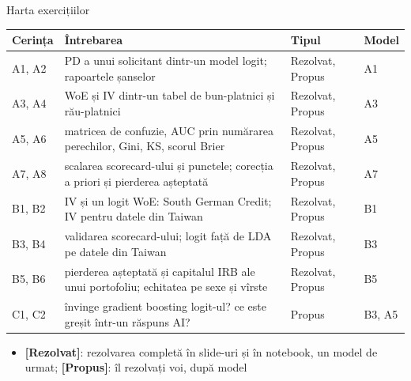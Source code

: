 \begin{frame}{Harta exercițiilor}
\itemsize{\small}
\begin{center}
\footnotesize
\begin{tabular}{>{\raggedright\arraybackslash}p{1.1cm}>{\raggedright\arraybackslash}p{7.5cm}>{\raggedright\arraybackslash}p{1.9cm}>{\raggedright\arraybackslash}p{1.4cm}}
\toprule
\textbf{Cerința} & \textbf{Întrebarea} & \textbf{Tipul} & \textbf{Model} \\
\midrule
A1, A2 & PD a unui solicitant dintr-un model logit; rapoartele șanselor & Rezolvat, Propus & A1 \\
A3, A4 & WoE și IV dintr-un tabel de bun-platnici și rău-platnici & Rezolvat, Propus & A3 \\
A5, A6 & matricea de confuzie, AUC prin numărarea perechilor, Gini, KS, scorul Brier & Rezolvat, Propus & A5 \\
A7, A8 & scalarea scorecard-ului și punctele; corecția a priori și pierderea așteptată & Rezolvat, Propus & A7 \\
B1, B2 & IV și un logit WoE: South German Credit; IV pentru datele din Taiwan & Rezolvat, Propus & B1 \\
B3, B4 & validarea scorecard-ului; logit față de LDA pe datele din Taiwan & Rezolvat, Propus & B3 \\
B5, B6 & pierderea așteptată și capitalul IRB ale unui portofoliu; echitatea pe sexe și vîrste & Rezolvat, Propus & B5 \\
C1, C2 & învinge gradient boosting logit-ul? ce este greșit într-un răspuns AI? & Propus & B3, A5 \\
\bottomrule
\end{tabular}
\end{center}
\begin{itemize}
    \item \textbf{[Rezolvat]}: rezolvarea completă în slide-uri și în notebook, un model de urmat; \textbf{[Propus]}: îl rezolvați voi, după model
\end{itemize}
\end{frame}

